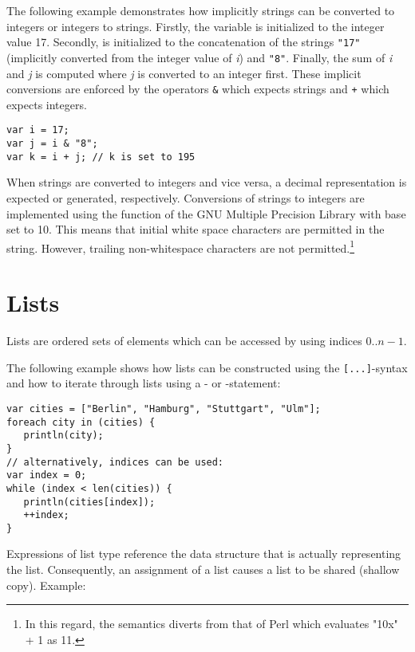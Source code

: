 The following example demonstrates how implicitly strings can be
converted to integers or integers to strings. Firstly, the variable
 is initialized to the integer value 17. Secondly, 
is initialized to the concatenation of the strings \lstinline!"17"!
(implicitly converted from the integer value of \textit{i}) and
\lstinline!"8"!. Finally, the sum of \textit{i} and \textit{j} is
computed where \textit{j} is converted to an integer first. These
implicit conversions are enforced by the operators \lstinline!&!
which expects strings and \lstinline!+! which expects integers.

\begin{lstlisting}
var i = 17;
var j = i & "8";
var k = i + j; // k is set to 195
\end{lstlisting}

When strings are converted to integers and vice versa,
a decimal representation is expected or generated, respectively.
Conversions of strings to integers are implemented using
the  function of the
GNU Multiple Precision Library
with base set to 10. This means that initial white space characters are
permitted in the string. However, trailing non-whitespace characters
are not permitted.\footnote{In this regard, the semantics diverts from that of
Perl which evaluates "10x" + 1 as 11.}

\section{Lists}

Lists are ordered sets of elements which can be accessed by
using indices $0..n-1$.

The following example shows how lists can be constructed
using the \lstinline![...]!-syntax and how to iterate through
lists using a - or -statement:

\begin{lstlisting}
var cities = ["Berlin", "Hamburg", "Stuttgart", "Ulm"];
foreach city in (cities) {
   println(city);
}
// alternatively, indices can be used:
var index = 0;
while (index < len(cities)) {
   println(cities[index]);
   ++index;
}
\end{lstlisting}

\noindent
Expressions of list type reference the data structure that is
actually representing the list. Consequently,
an assignment of a list causes a list to be shared
(shallow copy). Example:

